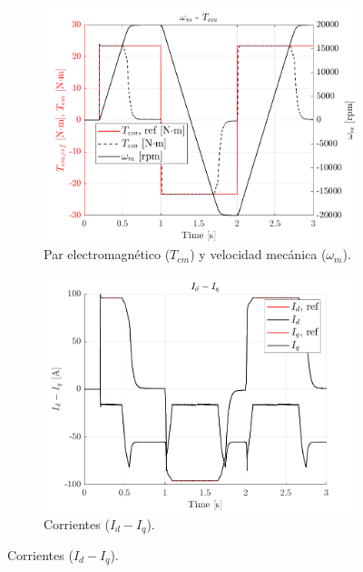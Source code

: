 \begin{figure}[H]
    \centering

    \begin{subfigure}{0.4\textwidth}
        \includegraphics[width=\linewidth]{fig/PLECS_Tem.png}
        \caption{Par electromagnético ($T_{em}$) y velocidad mecánica ($\omega_{m}$).}
    \end{subfigure}
    \begin{subfigure}{0.4\textwidth}
        \includegraphics[width=\linewidth]{fig/PLECS_idiq.png}
        \caption{Corrientes ($I_{d} - I_{q}$).}
    \end{subfigure}


\end{figure}

